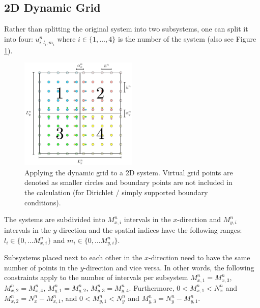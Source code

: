 \documentclass[fleqn]{jaes}
\begin{document}
\subsection{2D Dynamic Grid}
Rather than splitting the original system into two subsystems, one can split it into four: $u_{i, l_i, m_i}^n$ where $i\in\{1, \hdots, 4\}$ is the number of the system (also see Figure \ref{fig:2DGrid}). 
\begin{figure}[b]
    \centering
    \includegraphics[width=0.5\textwidth]{2DDynamicGrid.pdf}
    \caption{Applying the dynamic grid to a 2D system. Virtual grid points are denoted as smaller circles and boundary points are not included in the calculation (for Dirichlet / simply supported boundary conditions). 
    }
    \label{fig:2DGrid}
\end{figure}
%
The systems are subdivided into $M_{x,i}^n$ intervals in the $x$-direction and $M_{y,i}^n$ intervals in the $y$-direction and the spatial indices have the following ranges: $l_i \in\{0, \hdots M_{x,i}^n\}$ and $m_i \in\{0, \hdots M_{y,i}^n\}$. 

Subsystems placed next to each other in the $x$-direction need to have the same number of points in the $y$-direction and vice versa. In other words, the following constraints apply to the number of intervals per subsystem $M_{x, 1}^n = M_{x, 3}^n$, $M_{x, 2}^n = M_{x, 4}^n$, $M_{y, 1}^n = M_{y, 2}^n$, $M_{y, 3}^n = M_{y, 4}^n$. Furthermore, $0<M_{x,1}^n<N_x^n$ and $M_{x,2}^n = N_x^n-M_{x,1}^n$, and $0<M_{y,1}^n<N_y^n$ and $M_{y,3}^n = N_y^n-M_{y,1}^n$.
\end{document}
